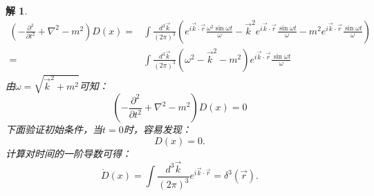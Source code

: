 \documentclass[UTF8,10pt,a4paper]{article}
\theoremstyle{Problem}%
\theoremstyle{Solution}%
\newtheorem*{sol}{解}%
\begin{document}
\begin{sol}
\begin{align*}
        \left( -\frac{\partial^2}{\partial t^2} + \nabla^2 - m^2 \right)D(x) =& \int \frac{d^3\vec{k}}{(2\pi)^3} \left( e^{i\vec{k} \cdot \vec{r}} \frac{\omega^2\sin\omega t}{\omega} - \vec{k}^2 e^{i\vec{k} \cdot \vec{r}} \frac{\sin\omega t}{\omega} - m^2 e^{i\vec{k} \cdot \vec{r}} \frac{\sin\omega t}{\omega} \right) \\
        =& \int \frac{d^3\vec{k}}{(2\pi)^3} (\omega^2-\vec{k}^2-m^2) e^{i\vec{k} \cdot \vec{r}} \frac{\sin\omega t}{\omega}
    \end{align*}
    由$\omega = \sqrt{\vec{k}^2 + m^2}$可知：
    \[
        \left( -\frac{\partial^2}{\partial t^2} + \nabla^2 - m^2 \right)D(x) = 0
    \]
    下面验证初始条件，当$t=0$时，容易发现：
    \[
        D(x) = 0.
    \]
    计算对时间的一阶导数可得：
    \[
        \dot{D}(x) = \int \frac{d^3\vec{k}}{(2\pi)^3} e^{i\vec{k} \cdot \vec{r}} = \delta^3(\vec{r}).
    \]

\end{sol}
\end{document}
